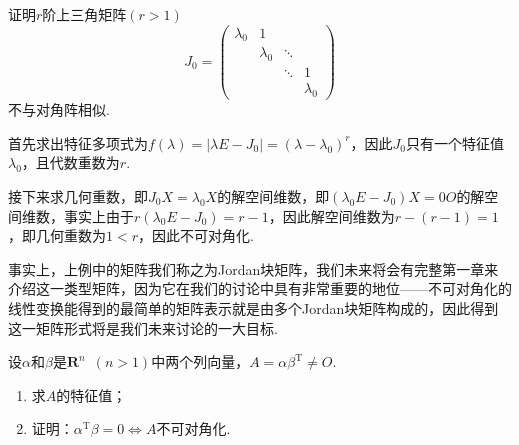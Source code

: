 \begin{example}
    证明$r$阶上三角矩阵$(r>1)$
    \[J_0=\begin{pmatrix}
            \lambda_0 & 1         &        &           \\
                      & \lambda_0 & \ddots &           \\
                      &           & \ddots & 1         \\
                      &           &        & \lambda_0
        \end{pmatrix}\]
    不与对角阵相似.
\end{example}

\begin{solution}
    首先求出特征多项式为$f(\lambda)=|\lambda E-J_0|=(\lambda-\lambda_0)^r$，因此$J_0$只有一个特征值$\lambda_0$，且代数重数为$r$.

    接下来求几何重数，即$J_0X=\lambda_0X$的解空间维数，即$(\lambda_0 E-J_0)X=0O$的解空间维数，事实上由于$r(\lambda_0 E-J_0)=r-1$，因此解空间维数为$r-(r-1)=1$，即几何重数为$1<r$，因此不可对角化.
\end{solution}

事实上，上例中的矩阵我们称之为Jordan块矩阵，我们未来将会有完整第一章来介绍这一类型矩阵，因为它在我们的讨论中具有非常重要的地位——不可对角化的线性变换能得到的最简单的矩阵表示就是由多个Jordan块矩阵构成的，因此得到这一矩阵形式将是我们未来讨论的一大目标.

\begin{example}\label{ex:19:秩1矩阵可对角化}
    设$\alpha$和$\beta$是$\mathbf{R}^n\enspace (n>1)$中两个列向量，$A=\alpha\beta^\mathrm{T}\neq O$.
    \begin{enumerate}
        \item 求$A$的特征值；

        \item 证明：$\alpha^\mathrm{T}\beta=0\iff A$不可对角化.
    \end{enumerate}
\end{example}

